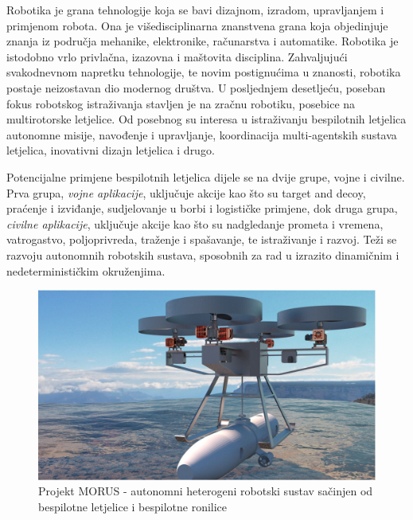 \documentclass[11pt,a4paper]{article}
\begin{document}
Robotika je grana tehnologije koja se bavi dizajnom, izradom, upravljanjem i primjenom robota. Ona je višedisciplinarna znanstvena grana koja objedinjuje znanja iz područja mehanike, elektronike, računarstva i automatike. \cite{kova} Robotika je istodobno vrlo privlačna, izazovna i maštovita disciplina. Zahvaljujući svakodnevnom napretku tehnologije, te novim postignućima u znanosti, robotika postaje neizostavan dio modernog društva. U posljednjem desetljeću, poseban fokus robotskog istraživanja stavljen je na zračnu robotiku, posebice na multirotorske letjelice. Od posebnog su interesa u istraživanju bespilotnih letjelica autonomne misije, navođenje i upravljanje, koordinacija multi-agentskih sustava letjelica, inovativni dizajn letjelica i drugo. 

\medskip

Potencijalne primjene bespilotnih letjelica dijele se na dvije grupe, vojne i civilne. Prva grupa, \textit{vojne aplikacije}, uključuje akcije kao što su target and decoy, praćenje i izviđanje, sudjelovanje u borbi i logističke primjene, dok druga grupa, \textit{civilne aplikacije}, uključuje akcije kao što su nadgledanje prometa i vremena, vatrogastvo, poljoprivreda, traženje i spašavanje, te istraživanje i razvoj. \cite{urs} Teži se razvoju autonomnih robotskih sustava, sposobnih za rad u izrazito dinamičnim i nedeterminističkim okruženjima.

\medskip

\begin{figure}[H]
	\centering
	\includegraphics[scale=0.35]{koord}
	\caption{Projekt MORUS - autonomni heterogeni robotski sustav sačinjen od bespilotne letjelice i bespilotne ronilice \cite{haus2}}
	\label{fig:koord}
\end{figure}
\end{document}
